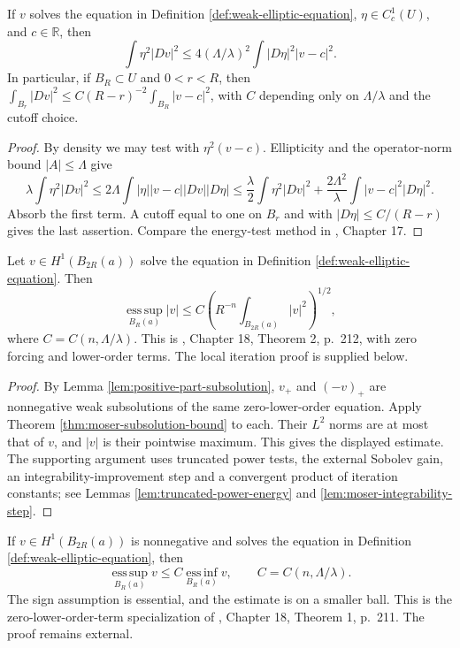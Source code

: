 \begin{lemma}\label{lem:caccioppoli}
If $v$ solves the equation in Definition \ref{def:weak-elliptic-equation}, $\eta\in C_c^1(U)$, and $c\in\mathbb R$, then
\[
 \int\eta^2|Dv|^2\leq4(\Lambda/\lambda)^2\int|D\eta|^2|v-c|^2.
\]
In particular, if $B_R\subset U$ and $0<r<R$, then $\int_{B_r}|Dv|^2\leq C(R-r)^{-2}\int_{B_R}|v-c|^2$, with $C$ depending only on $\Lambda/\lambda$ and the cutoff choice.
\end{lemma}
\begin{proof}
By density we may test with $\eta^2(v-c)$. Ellipticity and the operator-norm bound $|A|\leq\Lambda$ give
\[
 \lambda\int\eta^2|Dv|^2
 \leq 2\Lambda\int |\eta||v-c||Dv||D\eta|
 \leq\frac\lambda2\int\eta^2|Dv|^2+
 \frac{2\Lambda^2}{\lambda}\int|v-c|^2|D\eta|^2.
\]
Absorb the first term. A cutoff equal to one on $B_r$ and with $|D\eta|\leq C/(R-r)$ gives the last assertion. Compare the energy-test method in \cite{SimonPDE}, Chapter 17.
\end{proof}

\begin{theorem}\label{thm:elliptic-local-boundedness}
Let $v\in H^1(B_{2R}(a))$ solve the equation in Definition \ref{def:weak-elliptic-equation}. Then
\[
 \operatorname*{ess\,sup}_{B_R(a)}|v|
 \leq C\left(R^{-n}\int_{B_{2R}(a)}|v|^2\right)^{1/2},
\]
where $C=C(n,\Lambda/\lambda)$. This is \cite{SimonPDE}, Chapter 18, Theorem 2, p.~212, with zero forcing and lower-order terms. The local iteration proof is supplied below.
\end{theorem}
\begin{proof}
By Lemma \ref{lem:positive-part-subsolution}, $v_+$ and $(-v)_+$ are nonnegative weak subsolutions of the same zero-lower-order equation. Apply Theorem \ref{thm:moser-subsolution-bound} to each. Their $L^2$ norms are at most that of $v$, and $|v|$ is their pointwise maximum. This gives the displayed estimate. The supporting argument uses truncated power tests, the external Sobolev gain, an integrability-improvement step and a convergent product of iteration constants; see Lemmas \ref{lem:truncated-power-energy} and \ref{lem:moser-integrability-step}.
\end{proof}

\begin{theorem}\label{thm:elliptic-harnack}
If $v\in H^1(B_{2R}(a))$ is nonnegative and solves the equation in Definition \ref{def:weak-elliptic-equation}, then
\[
 \operatorname*{ess\,sup}_{B_R(a)}v\leq
 C\operatorname*{ess\,inf}_{B_R(a)}v,
 \qquad C=C(n,\Lambda/\lambda).
\]
The sign assumption is essential, and the estimate is on a smaller ball. This is the zero-lower-order-term specialization of \cite{SimonPDE}, Chapter 18, Theorem 1, p.~211. The proof remains external.
\end{theorem}

